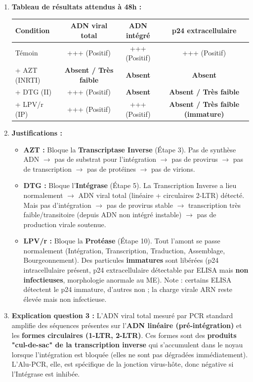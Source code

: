 \documentclass[11pt]{article}
\begin{document}
\begin{corrige}
\begin{enumerate}
    \item \textbf{Tableau de résultats attendus à 48h :}
    \begin{center}
    \begin{tabular}{|l|c|c|c|}\hline
    \textbf{Condition} & \textbf{ADN viral total} & \textbf{ADN intégré} & \textbf{p24 extracellulaire} \\ \hline
    Témoin & +++ (Positif) & +++ (Positif) & +++ (Positif) \\ \hline
    + AZT (INRTI) & \textbf{Absent / Très faible} & \textbf{Absent} & \textbf{Absent} \\ \hline
    + DTG (II) & +++ (Positif) & \textbf{Absent} & \textbf{Absent / Très faible} \\ \hline
    + LPV/r (IP) & +++ (Positif) & +++ (Positif) & \textbf{Absent / Très faible (immature)} \\ \hline
    \end{tabular}
    \end{center}
    \item \textbf{Justifications :}
    \begin{itemize}
        \item \textbf{AZT :} Bloque la \textbf{Transcriptase Inverse} (Étape 3). Pas de synthèse ADN $\to$ pas de substrat pour l'intégration $\to$ pas de provirus $\to$ pas de transcription $\to$ pas de protéines $\to$ pas de virions.
        \item \textbf{DTG :} Bloque l'\textbf{Intégrase} (Étape 5). La Transcription Inverse a lieu normalement $\to$ ADN viral total (linéaire + circulaires 2-LTR) détecté. Mais pas d'intégration $\to$ pas de provirus stable $\to$ transcription très faible/transitoire (depuis ADN non intégré instable) $\to$ pas de production virale soutenue.
        \item \textbf{LPV/r :} Bloque la \textbf{Protéase} (Étape 10). Tout l'amont se passe normalement (Intégration, Transcription, Traduction, Assemblage, Bourgeonnement). Des particules \textbf{immatures} sont libérées (p24 intracellulaire présent, p24 extracellulaire détectable par ELISA mais \textbf{non infectieuses}, morphologie anormale au ME). Note : certains ELISA détectent le p24 immature, d'autres non ; la charge virale ARN reste élevée mais non infectieuse.
    \end{itemize}
    \item \textbf{Explication question 3 :} L'ADN viral total mesuré par PCR standard amplifie des séquences présentes sur l'\textbf{ADN linéaire (pré-intégration)} et les \textbf{formes circulaires (1-LTR, 2-LTR)}. Ces formes sont des \textbf{produits "cul-de-sac" de la transcription inverse} qui s'accumulent dans le noyau lorsque l'intégration est bloquée (elles ne sont pas dégradées immédiatement). L'Alu-PCR, elle, est spécifique de la jonction virus-hôte, donc négative si l'Intégrase est inhibée.
\end{enumerate}
\end{corrige}
\end{document}
